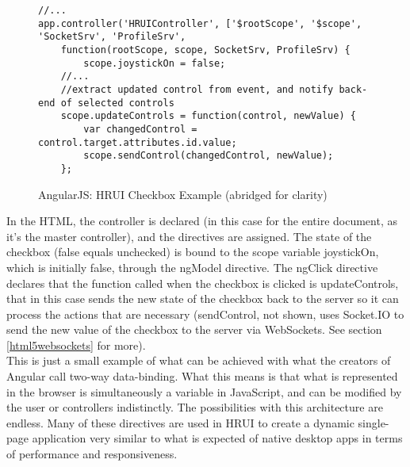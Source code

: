 \begin{figure}[H]
\centering
\captionsetup{justification=centering}
\begin{verbatim}
//...
app.controller('HRUIController', ['$rootScope', '$scope', 'SocketSrv', 'ProfileSrv',
    function(rootScope, scope, SocketSrv, ProfileSrv) {
        scope.joystickOn = false;
    //...
    //extract updated control from event, and notify back-end of selected controls
    scope.updateControls = function(control, newValue) {
        var changedControl = control.target.attributes.id.value;
        scope.sendControl(changedControl, newValue);
    };
\end{verbatim}
\caption{AngularJS: HRUI Checkbox Example (abridged for clarity)}
\end{figure}
In the HTML, the controller is declared (in this case for the entire document, as it's the master controller), and the directives are
assigned. The state of the checkbox (false equals unchecked) is bound to the scope variable joystickOn, which is initially false,
through the ngModel directive. The ngClick directive declares that the function called when the checkbox is clicked is updateControls,
that in this case sends the new state of the checkbox back to the server so it can process the actions that are necessary (sendControl,
not shown, uses Socket.IO to send the new value of the checkbox to the server via WebSockets. See section \ref{html5websockets} for
more).\\

This is just a small example of what can be achieved with what the creators of Angular call two-way data-binding. What this means is
that what is represented in the browser is simultaneously a variable in JavaScript, and can be modified by the user or controllers
indistinctly. The possibilities with this architecture are endless. Many of these directives are used in HRUI to create a dynamic 
single-page application very similar to what is expected of native desktop apps in terms of performance and responsiveness.\\

